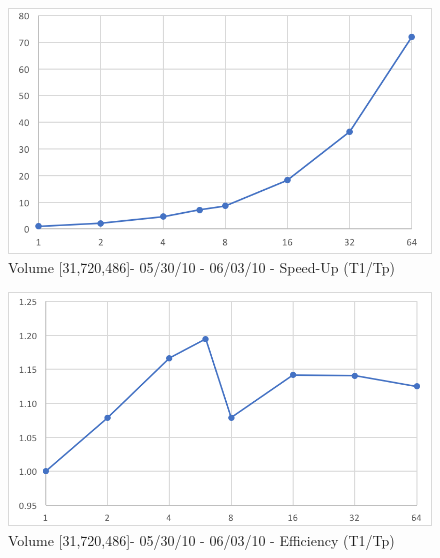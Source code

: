 \documentclass[12pt]{article} %
\begin{document}
\begin{figure}[htb]
\caption{Volume [31,720,486]- 05/30/10 - 06/03/10 - Speed-Up (T1/Tp)}\label{fig:benchmark01}
\centering
\includegraphics[width=15cm,keepaspectratio]{imgs/img17.png}
\end{figure} 

\begin{figure}[htb]
\caption{Volume [31,720,486]- 05/30/10 - 06/03/10 - Efficiency (T1/Tp)}\label{fig:benchmark01}
\centering
\includegraphics[width=15cm,keepaspectratio]{imgs/img18.png}
\end{figure} 
\end{document}
